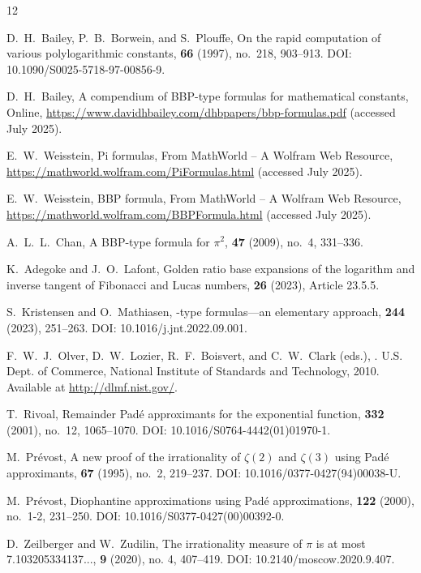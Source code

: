 \documentclass[11pt]{article}
\numberwithin{equation}{section}
\theoremstyle{plain}
\begin{document}
\begin{thebibliography}{12}

 D.~H.~Bailey, P.~B.~Borwein, and S.~Plouffe,
\newblock On the rapid computation of various polylogarithmic constants,
 \textbf{66} (1997), no.~218, 903--913. DOI: 10.1090/S0025-5718-97-00856-9.

 D.~H.~Bailey, 
\newblock A compendium of {BBP}-type formulas for mathematical constants, 
\newblock Online, \url{https://www.davidhbailey.com/dhbpapers/bbp-formulas.pdf} (accessed July 2025).

 E.~W.~Weisstein, 
\newblock Pi formulas,
\newblock From MathWorld -- A Wolfram Web Resource, \url{https://mathworld.wolfram.com/PiFormulas.html} (accessed July 2025).

 E.~W.~Weisstein, 
\newblock BBP formula,
\newblock From MathWorld -- A Wolfram Web Resource, \url{https://mathworld.wolfram.com/BBPFormula.html} (accessed July 2025).

 A.~L.~L.~Chan, 
\newblock A {BBP}-type formula for $\pi^{2}$, 
 \textbf{47} (2009), no.~4, 331--336.

 K.~Adegoke and J.~O.~Lafont, 
\newblock Golden ratio base expansions of the logarithm and inverse tangent of Fibonacci and Lucas numbers, 
 \textbf{26} (2023), Article 23.5.5.

 S.~Kristensen and O.~Mathiasen, 
-type formulas---an elementary approach, 
 \textbf{244} (2023), 251--263. DOI: 10.1016/j.jnt.2022.09.001.

 F.~W.~J.~Olver, D.~W.~Lozier, R.~F.~Boisvert,
and C.~W.~Clark (eds.), 
. 
\newblock U.S. Dept. of Commerce, National Institute of Standards and Technology, 2010. 
\newblock Available at \url{http://dlmf.nist.gov/}.

 T.~Rivoal,
\newblock Remainder Padé approximants for the exponential function,
 \textbf{332} (2001), no.~12, 1065--1070. DOI: 10.1016/S0764-4442(01)01970-1.

 M.~Prévost,
\newblock A new proof of the irrationality of $\zeta(2)$ and $\zeta(3)$ using Padé approximants,
 \textbf{67} (1995), no.~2, 219--237. DOI: 10.1016/0377-0427(94)00038-U.

 M.~Prévost,
\newblock Diophantine approximations using Padé approximations,
 \textbf{122} (2000), no.~1-2, 231--250. DOI: 10.1016/S0377-0427(00)00392-0.

 D.~Zeilberger and W.~Zudilin,
\newblock The irrationality measure of $\pi$ is at most 7.103205334137...,
 \textbf{9} (2020), no. 4, 407--419. DOI: 10.2140/moscow.2020.9.407.

\end{thebibliography}
\end{document}
